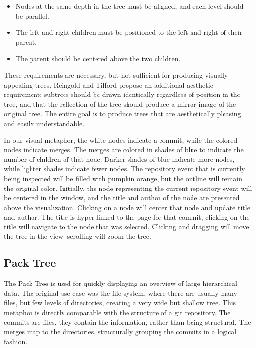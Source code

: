 \begin{itemize}
  \item

    Nodes at the same depth in the tree must be aligned, and each level
    should be parallel.

  \item

    The left and right children must be positioned to the left and right
    of their parent.

  \item

    The parent should be centered above the two children.

\end{itemize}

These requirements are necessary, but not sufficient for producing
visually appealing trees. Reingold and Tilford propose an additional
aesthetic requirement; subtrees should be drawn identically regardless
of position in the tree, and that the reflection of the tree should
produce a mirror-image of the original tree. The entire goal is to
produce trees that are aesthetically pleasing and easily understandable.

In our visual metaphor, the white nodes indicate a commit, while the
colored nodes indicate merges. The merges are colored in shades of blue
to indicate the number of children of that node. Darker shades of blue
indicate more nodes, while lighter shades indicate fewer nodes. The
repository event that is currently being inspected will be filled with
pumpkin orange, but the outline will remain the original color.
Initially, the node representing the current repository event will be
centered in the window, and the title and author of the node are
presented above the visualization. Clicking on a node will center that
node and update title and author. The title is hyper-linked to the page
for that commit, clicking on the title will navigate to the node that
was selected. Clicking and dragging will move the tree in the view,
scrolling will zoom the tree.

\subsection{Pack Tree}
\label{sub:pack_tree}

The Pack Tree\cite{Wang2006} is used for quickly displaying an overview
of large hierarchical data. The original use-case was the file system,
where there are usually many files, but few levels of directories,
creating a very wide but shallow tree. This metaphor is directly
comparable with the structure of a git repository. The commits are
files, they contain the information, rather than being structural. The
merges map to the directories, structurally grouping the commits in a
logical fashion.

